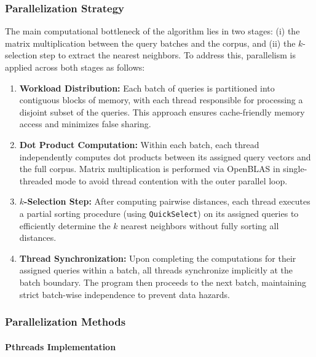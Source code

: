 \documentclass{article}
\begin{document}
\subsubsection{Parallelization Strategy}

The main computational bottleneck of the algorithm lies in two stages: (i) the matrix multiplication between 
the query batches and the corpus, and (ii) the $k$-selection step to extract the nearest neighbors. To address
this, parallelism is applied across both stages as follows:

\begin{enumerate}
    \item \textbf{Workload Distribution:} Each batch of queries is partitioned into contiguous blocks of 
    memory, with each thread responsible for processing a disjoint subset of the queries. This approach ensures 
    cache-friendly memory access and minimizes false sharing.
    
    \item \textbf{Dot Product Computation:} Within each batch, each thread independently computes dot products
    between its assigned query vectors and the full corpus. Matrix multiplication is performed via OpenBLAS 
    in single-threaded mode to avoid thread contention with the outer parallel loop.
    
    \item \textbf{$k$-Selection Step:} After computing pairwise distances, each thread executes a partial 
    sorting procedure (using \texttt{QuickSelect}) on its assigned queries to efficiently determine the $k$ 
    nearest neighbors without fully sorting all distances.
    
    \item \textbf{Thread Synchronization:} Upon completing the computations for their assigned queries 
    within a batch, all threads synchronize implicitly at the batch boundary. The program then proceeds to 
    the next batch, maintaining strict batch-wise independence to prevent data hazards.
\end{enumerate}

\subsubsection{Parallelization Methods}

\paragraph{Pthreads Implementation}
\end{document}
